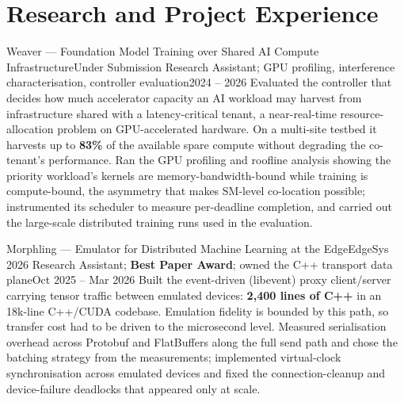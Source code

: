 \section{Research and Project Experience}
  \resumeSubHeadingListStart

    \resumeSubheading
      {Weaver --- Foundation Model Training over Shared AI Compute Infrastructure}{Under Submission}
      {Research Assistant; GPU profiling, interference characterisation, controller evaluation}{2024 -- 2026}
      \resumeItemListStart
          {Evaluated the controller that decides how much accelerator capacity an AI workload may harvest from infrastructure shared with a latency-critical tenant, a near-real-time resource-allocation problem on GPU-accelerated hardware. On a multi-site testbed it harvests up to \textbf{83\%} of the available spare compute without degrading the co-tenant's performance.}
          {Ran the GPU profiling and roofline analysis showing the priority workload's kernels are memory-bandwidth-bound while training is compute-bound, the asymmetry that makes SM-level co-location possible; instrumented its scheduler to measure per-deadline completion, and carried out the large-scale distributed training runs used in the evaluation.}
      \resumeItemListEnd

    \resumeSubheading
      {Morphling --- Emulator for Distributed Machine Learning at the Edge}{EdgeSys 2026}
      {Research Assistant; \textbf{Best Paper Award}; owned the C++ transport data plane}{Oct 2025 -- Mar 2026}
      \resumeItemListStart
          {Built the event-driven (libevent) proxy client/server carrying tensor traffic between emulated devices: \textbf{2{,}400 lines of C++} in an 18k-line C++/CUDA codebase. Emulation fidelity is bounded by this path, so transfer cost had to be driven to the microsecond level.}
          {Measured serialisation overhead across Protobuf and FlatBuffers along the full send path and chose the batching strategy from the measurements; implemented virtual-clock synchronisation across emulated devices and fixed the connection-cleanup and device-failure deadlocks that appeared only at scale.}
      \resumeItemListEnd

